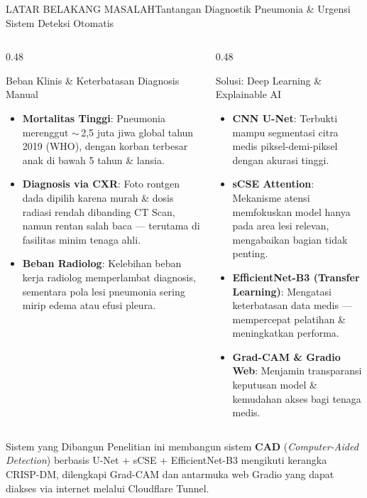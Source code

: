 \documentclass[aspectratio=169,11pt]{beamer}
\begin{document}
\begin{frame}{LATAR BELAKANG MASALAH}{Tantangan Diagnostik Pneumonia \& Urgensi Sistem Deteksi Otomatis}
\begin{columns}[T]
  \begin{column}{0.48\textwidth}
    \begin{block}{\footnotesize Beban Klinis \& Keterbatasan Diagnosis Manual}
      \begin{itemize}\scriptsize
        \item \textbf{Mortalitas Tinggi}: Pneumonia merenggut $\sim$\,2,5 juta jiwa global tahun 2019 (WHO), dengan korban terbesar anak di bawah 5 tahun \& lansia.
        \item \textbf{Diagnosis via CXR}: Foto rontgen dada dipilih karena murah \& dosis radiasi rendah dibanding CT Scan, namun rentan salah baca --- terutama di fasilitas minim tenaga ahli.
        \item \textbf{Beban Radiolog}: Kelebihan beban kerja radiolog memperlambat diagnosis, sementara pola lesi pneumonia sering mirip edema atau efusi pleura.
      \end{itemize}
    \end{block}
  \end{column}
  
  \begin{column}{0.48\textwidth}
    \begin{block}{\footnotesize Solusi: Deep Learning \& Explainable AI}
      \begin{itemize}\scriptsize
        \item \textbf{CNN U-Net}: Terbukti mampu segmentasi citra medis piksel-demi-piksel dengan akurasi tinggi.
        \item \textbf{sCSE Attention}: Mekanisme atensi memfokuskan model hanya pada area lesi relevan, mengabaikan bagian tidak penting.
        \item \textbf{EfficientNet-B3 (Transfer Learning)}: Mengatasi keterbatasan data medis --- mempercepat pelatihan \& meningkatkan performa.
        \item \textbf{Grad-CAM \& Gradio Web}: Menjamin transparansi keputusan model \& kemudahan akses bagi tenaga medis.
      \end{itemize}
    \end{block}
  \end{column}
\end{columns}
\vspace{0.05cm}
\begin{alertblock}{\footnotesize Sistem yang Dibangun}
  \scriptsize Penelitian ini membangun sistem \textbf{CAD} (\textit{Computer-Aided Detection}) berbasis U-Net + sCSE + EfficientNet-B3 mengikuti kerangka CRISP-DM, dilengkapi Grad-CAM dan antarmuka web Gradio yang dapat diakses via internet melalui Cloudflare Tunnel.
\end{alertblock}
\end{frame}
\end{document}
